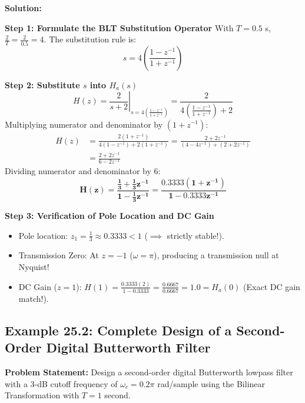 \documentclass[11pt,a4paper]{article}
\begin{document}
\vspace{1mm}
\noindent\textbf{Solution:}

\noindent\textbf{Step 1: Formulate the BLT Substitution Operator}
With $T = 0.5$ s, $\frac{2}{T} = \frac{2}{0.5} = 4$. The substitution rule is:
\begin{equation}
s = 4 \left( \frac{1 - z^{-1}}{1 + z^{-1}} \right)
\end{equation}

\noindent\textbf{Step 2: Substitute $s$ into $H_a(s)$}
\begin{equation}
H(z) = \left. \frac{2}{s + 2} \right|_{s = 4 \left(\frac{1 - z^{-1}}{1 + z^{-1}}\right)} = \frac{2}{4\left(\frac{1 - z^{-1}}{1 + z^{-1}}\right) + 2}
\end{equation}
Multiplying numerator and denominator by $(1 + z^{-1})$:
\begin{align}
H(z) &= \frac{2(1 + z^{-1})}{4(1 - z^{-1}) + 2(1 + z^{-1})} = \frac{2 + 2z^{-1}}{(4 - 4z^{-1}) + (2 + 2z^{-1})} \nonumber \\
     &= \frac{2 + 2z^{-1}}{6 - 2z^{-1}}
\end{align}
Dividing numerator and denominator by $6$:
\begin{equation}
\mathbf{H(z) = \frac{\frac{1}{3} + \frac{1}{3} z^{-1}}{1 - \frac{1}{3} z^{-1}} = \frac{0.3333(1 + z^{-1})}{1 - 0.3333 z^{-1}}}
\end{equation}

\noindent\textbf{Step 3: Verification of Pole Location and DC Gain}
\begin{itemize}
    \item Pole location: $z_1 = \frac{1}{3} \approx 0.3333 < 1$ ($\implies$ strictly stable!).
    \item Transmission Zero: At $z = -1$ ($\omega = \pi$), producing a transmission null at Nyquist!
    \item DC Gain ($z = 1$): $H(1) = \frac{0.3333(2)}{1 - 0.3333} = \frac{0.6667}{0.6667} = \mathbf{1.0} = H_a(0)$ (Exact DC gain match!).
\end{itemize}

\vspace{2mm}
\subsection{Example 25.2: Complete Design of a Second-Order Digital Butterworth Filter}
\textbf{Problem Statement:} Design a second-order digital Butterworth lowpass filter with a 3-dB cutoff frequency of $\omega_c = 0.2\pi$ rad/sample using the Bilinear Transformation with $T = 1$ second.
\end{document}
